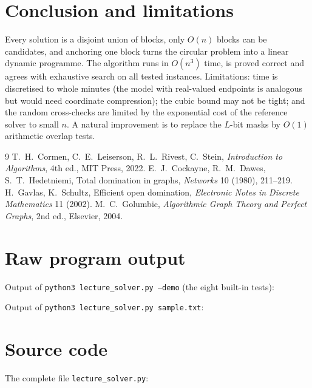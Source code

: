 \documentclass[11pt,a4paper]{article}
\theoremstyle{definition}
\theoremstyle{remark}
\begin{document}
\section{Conclusion and limitations}
Every solution is a disjoint union of blocks, only $O(n)$ blocks can be candidates, and
anchoring one block turns the circular problem into a linear dynamic programme.  The algorithm runs in $O(n^3)$
time, is proved correct and agrees with exhaustive search on all tested instances.
Limitations: time is discretised to whole minutes (the model with real-valued endpoints is
analogous but would need coordinate compression); the cubic bound may not be tight; and the
random cross-checks are limited by the exponential cost of the reference solver to small $n$.
A natural improvement is to replace the $L$-bit masks by $O(1)$ arithmetic overlap tests.

\begin{thebibliography}{9}
 T.~H.~Cormen, C.~E.~Leiserson, R.~L.~Rivest, C.~Stein,
\emph{Introduction to Algorithms}, 4th ed., MIT Press, 2022.
 E.~J.~Cockayne, R.~M.~Dawes, S.~T.~Hedetniemi,
Total domination in graphs, \emph{Networks} 10 (1980), 211--219.
 H.~Gavlas, K.~Schultz, Efficient open domination,
\emph{Electronic Notes in Discrete Mathematics} 11 (2002).
 M.~C.~Golumbic, \emph{Algorithmic Graph Theory and Perfect Graphs},
2nd ed., Elsevier, 2004.
\end{thebibliography}

\appendix
\section{Raw program output}\label{app:out}
Output of \texttt{python3 lecture\_solver.py --demo} (the eight built-in tests):
{\footnotesize
{}}

\noindent Output of \texttt{python3 lecture\_solver.py sample.txt}:
{\footnotesize
{}}

\section{Source code}\label{app:src}
The complete file \texttt{lecture\_solver.py}:

\end{document}
